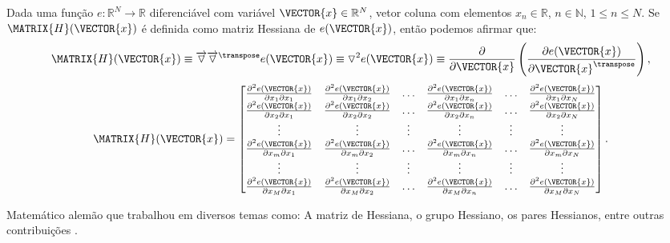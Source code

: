 \begin{proposition}\label{def:hessian}
 Dada uma função $e:\mathbb{R}^{N}\rightarrow \mathbb{R}$ diferenciável com variável $\VECTOR{x} \in \mathbb{R}^{N}$,
 vetor coluna  com elementos $x_n\in \mathbb{R}$, $n\in \mathbb{N}$, $1 \leq n \leq N$.
 Se $\MATRIX{H}(\VECTOR{x})$ é definida como matriz Hessiana \cite[pp. 150]{zhang2017matrix} \cite{Hessian} 
 de $e(\VECTOR{x})$, então podemos afirmar que: 
\begin{equation}
  \MATRIX{H}(\VECTOR{x}) \equiv  \overrightarrow{\triangledown} \overrightarrow{\triangledown}^{\transpose}e(\VECTOR{x}) \equiv  
\triangledown^2 e(\VECTOR{x}) \equiv \frac{\partial }{\partial \VECTOR{x}} \left( \frac{\partial e(\VECTOR{x})}{ \partial \VECTOR{x}^{\transpose} }\right), 
\end{equation}
 \begin{equation}
  \MATRIX{H}(\VECTOR{x}) =
\left[
\begin{matrix}
\frac{\partial^2 e(\VECTOR{x}) }{\partial x_{1}\partial x_{1}}&
\frac{\partial^2 e(\VECTOR{x}) }{\partial x_{1}\partial x_{2}}&
\hdots&
\frac{\partial^2 e(\VECTOR{x}) }{\partial x_{1}\partial x_{n}}&
\hdots&
\frac{\partial^2 e(\VECTOR{x}) }{\partial x_{1}\partial x_{N}}\\
\frac{\partial^2 e(\VECTOR{x}) }{\partial x_{2}\partial x_{1}}&
\frac{\partial^2 e(\VECTOR{x}) }{\partial x_{2}\partial x_{2}}&
\hdots&
\frac{\partial^2 e(\VECTOR{x}) }{\partial x_{2}\partial x_{n}}&
\hdots&
\frac{\partial^2 e(\VECTOR{x}) }{\partial x_{2}\partial x_{N}}\\
\vdots&
\vdots&
\vdots&
\vdots&
\vdots&
\vdots\\
\frac{\partial^2 e(\VECTOR{x}) }{\partial x_{m}\partial x_{1}}&
\frac{\partial^2 e(\VECTOR{x}) }{\partial x_{m}\partial x_{2}}&
\hdots&
\frac{\partial^2 e(\VECTOR{x}) }{\partial x_{m}\partial x_{n}}&
\hdots&
\frac{\partial^2 e(\VECTOR{x}) }{\partial x_{m}\partial x_{N}}\\
\vdots&
\vdots&
\vdots&
\vdots&
\vdots&
\vdots\\
\frac{\partial^2 e(\VECTOR{x}) }{\partial x_{M}\partial x_{1}}&
\frac{\partial^2 e(\VECTOR{x}) }{\partial x_{M}\partial x_{2}}&
\hdots&
\frac{\partial^2 e(\VECTOR{x}) }{\partial x_{M}\partial x_{n}}&
\hdots&
\frac{\partial^2 e(\VECTOR{x}) }{\partial x_{M}\partial x_{N}}\\
\end{matrix}
\right].
 \end{equation}
\end{proposition}

\begin{elaboracion}[title=Ludwig Otto Hesse (1811-1874), width= 0.99\linewidth]
Matemático alemão que trabalhou em diversos temas como: A matriz de Hessiana, 
o grupo Hessiano, os pares Hessianos, entre outras contribuições \cite[pp. 261]{agarwal2014creators}.
\end{elaboracion}
